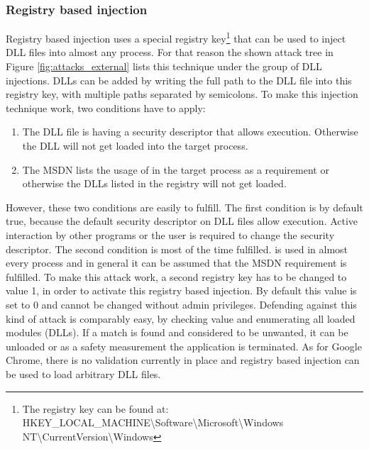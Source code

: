 \subsubsection{Registry based injection}
Registry based injection uses a special registry key\footnote{The registry key can be found at: HKEY\_LOCAL\_MACHINE\textbackslash Software\textbackslash Microsoft\textbackslash Windows NT\textbackslash CurrentVersion\textbackslash Windows} that can be used to inject DLL files into almost any process. For that reason the shown attack tree in Figure \ref{fig:attacks_external} lists this technique under the group of DLL injections. DLLs can be added by writing the full path to the DLL file into this registry key, with multiple paths separated by semicolons. To make this injection technique work, two conditions have to apply:
\begin{enumerate}
\item The DLL file is having a security descriptor that allows execution. Otherwise the DLL will not get loaded into the target process.
\item The MSDN\cite{msdn_appinitdlls} lists the usage of  in the target process as a requirement or otherwise the DLLs listed in the registry will not get loaded.
\end{enumerate}
However, these two conditions are easily to fulfill. The first condition is by default true, because the default security descriptor on DLL files allow execution. Active interaction by other programs or the user is required to change the security descriptor. The second condition is most of the time fulfilled.  is used in almost every process and in general it can be assumed that the MSDN requirement is fulfilled. To make this attack work, a second registry key  has to be changed to value 1, in order to activate this registry based injection. By default this value is set to 0 and cannot be changed without admin privileges.
Defending against this kind of attack is comparably easy, by checking  value and enumerating all loaded modules (DLLs). If a match is found and considered to be unwanted, it can be unloaded or as a safety measurement the application is terminated. As for Google Chrome, there is no validation currently in place and registry based injection can be used to load arbitrary DLL files.